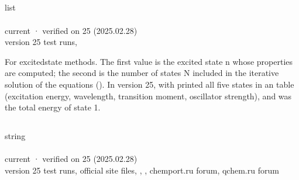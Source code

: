 \documentclass[letterpaper,10pt,english,openany,oneside]{sphinxmanual}
\begin{document}
\sphinxAtStartPar
{} {\hyperref[\detokenize{reference/dft:dft-functional}]{}}


\subsection{}
\label{\detokenize{reference/control:state}}\label{\detokenize{reference/control:control-state}}
\ignorespaces 
\sphinxAtStartPar
{} list\\
 \\
 current · verified on 25 (2025.02.28)\\
 version 25 test runs, 

\sphinxAtStartPar
For excited\sphinxhyphen{}state methods. The first value is the excited state n whose properties are computed; the second
is the number of states N included in the iterative solution of the equations (). In version 25,
 with  printed all five states in an  table (excitation energy,
wavelength, transition moment, oscillator strength), and  was the total energy of state 1.


\subsection{}
\label{\detokenize{reference/control:basis}}\label{\detokenize{reference/control:control-basis}}
\ignorespaces 
\sphinxAtStartPar
{} string\\
 \\
 current · verified on 25 (2025.02.28)\\
 version 25 test runs, official site files, , , chemport.ru forum, qchem.ru forum
\end{document}
